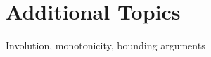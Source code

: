 \documentclass[../../../main.tex]{subfiles}
\begin{document}
\section{Additional Topics}
Involution, monotonicity, bounding arguments
\end{document}
